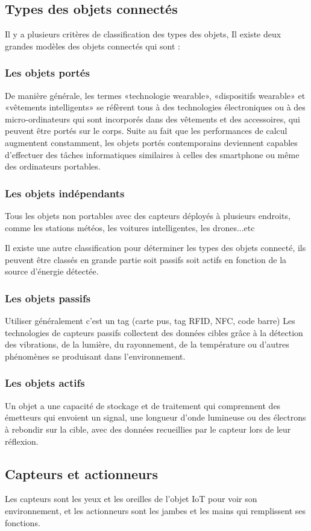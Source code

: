 \subsection{Types des objets connectés}
Il y a plusieurs critères de classification des types des objets, Il existe deux grandes modèles des objets connectés qui sont : 
\subsubsection{Les objets portés } De manière générale, les termes «technologie wearable», «dispositifs wearable» et «vêtements intelligents» se réfèrent tous à des technologies électroniques ou à des micro-ordinateurs qui sont incorporés dans des vêtements et des accessoires, qui peuvent être portés sur le corps. Suite au fait que les performances de calcul augmentent constamment, les objets portés contemporains deviennent capables d'effectuer des tâches informatiques similaires à celles des smartphone ou même des ordinateurs portables.
\subsubsection{Les objets indépendants} Tous les objets non portables avec des capteurs déployés à plusieurs endroits, comme les stations météos, les voitures intelligentes, les drones...etc

Il existe une autre classification pour déterminer les types des objets connecté, ils peuvent être classés en grande partie soit passifs soit actifs en fonction de la source d’énergie détectée.
\subsubsection{Les objets passifs} Utiliser généralement c’est un tag (carte pus, tag RFID, NFC, code barre) Les technologies de capteurs passifs collectent des données cibles grâce à la détection des vibrations, de la lumière, du rayonnement, de la température  ou d'autres phénomènes se produisant dans l'environnement.
\subsubsection{Les objets actifs} Un objet a une capacité de stockage et de traitement qui comprennent des émetteurs qui envoient un signal, une longueur d'onde lumineuse ou des électrons à rebondir sur la cible, avec des données recueillies par le capteur lors de leur réflexion.
\subsection{Capteurs et actionneurs}
Les capteurs sont les yeux et les oreilles de l'objet IoT pour voir son environnement, et les actionneurs sont les jambes et les mains qui remplissent ses fonctions.
